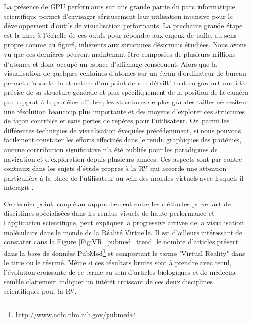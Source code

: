 La présence de GPU performants sur une grande partie du parc informatique scientifique permet d'envisager sérieusement leur utilisation intensive pour le développement d'outils de visualisation performants. La prochaine grande étape est la mise à l'échelle de ces outils pour répondre aux enjeux de taille, au sens propre comme au figuré, inhérents aux structures désormais étudiées. Nous avons vu que ces dernières peuvent maintenant être composées de plusieurs millions d'atomes et donc occupé un espace d'affichage conséquent. Alors que la visualisation de quelques centaines d'atomes sur un écran d'ordinateur de bureau permet d'aborder la structure d'un point de vue détaillé tout en gardant une idée précise de sa structure générale et plus spécifiquement de la position de la caméra par rapport à la protéine affichée, les structures de plus grandes tailles nécessitent une résolution beaucoup plus importante et des moyens d'explorer ces structures de façon contrôlée et sans pertes de repères pour l'utilisateur. Or, parmi les différentes techniques de visualisation évoquées précédemment, si nous pouvons facilement constater les efforts effectués dans le rendu graphiques des protéines, aucune contribution significative n'a été publiée pour les paradigmes de navigation et d'exploration depuis plusieurs années. Ces aspects sont par contre centraux dans les sujets d'étude propres à la RV qui accorde une attention particulière à la place de l'utilisateur au sein des mondes virtuels avec lesquels il interagit \cite{SHOCAM, Hovercam, etc.}.

Ce dernier point, couplé au rapprochement entre les méthodes provenant de disciplines spécialisées dans les rendus visuels de haute performance et l'application scientifique, peut expliquer la progressive arrivée de la visualisation moléculaire dans le monde de la Réalité Virtuelle. Il est d'ailleurs intéressant de constater dans la Figure \ref{Fig:VR_pubmed_trend} le nombre d'articles présent dans la base de données PubMed\footnote{\url{http://www.ncbi.nlm.nih.gov/pubmed}} et comportant le terme "Virtual Reality" dans le titre ou le résumé. Même si ces résultats brutes sont à prendre avec recul, l'évolution croissante de ce terme au sein d'articles biologiques et de médecine semble clairement indiquer un intérêt croissant de ces deux disciplines scientifiques pour la RV.

